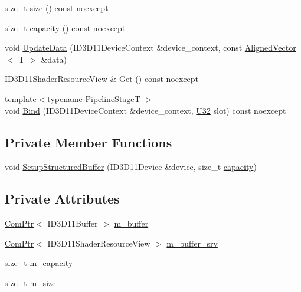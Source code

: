 \begin{DoxyCompactItemize}
\item 
size\+\_\+t \mbox{\hyperlink{classmage_1_1rendering_1_1_structured_buffer_aa7e7d6cc81b608d6333cd2c659189605}{size}} () const noexcept
\item 
size\+\_\+t \mbox{\hyperlink{classmage_1_1rendering_1_1_structured_buffer_aa7b9ec40ba586d8f4a063926d4924b70}{capacity}} () const noexcept
\item 
void \mbox{\hyperlink{classmage_1_1rendering_1_1_structured_buffer_af08d78a68111bc28890eb10610db8a73}{Update\+Data}} (I\+D3\+D11\+Device\+Context \&device\+\_\+context, const \mbox{\hyperlink{namespacemage_a8664bfb5ce2179fc64eae9f82c8a5ba8}{Aligned\+Vector}}$<$ T $>$ \&data)
\item 
I\+D3\+D11\+Shader\+Resource\+View \& \mbox{\hyperlink{classmage_1_1rendering_1_1_structured_buffer_af7e538ca119896eb776d0da6b18029ea}{Get}} () const noexcept
\item 
{\footnotesize template$<$typename Pipeline\+StageT $>$ }\\void \mbox{\hyperlink{classmage_1_1rendering_1_1_structured_buffer_aeef55c61fc5331b08c3ae2cba8f8de64}{Bind}} (I\+D3\+D11\+Device\+Context \&device\+\_\+context, \mbox{\hyperlink{namespacemage_aa5d6eaabaac3cdd01873d6a3d27e90f3}{U32}} slot) const noexcept
\end{DoxyCompactItemize}
\subsection*{Private Member Functions}
\begin{DoxyCompactItemize}
\item 
void \mbox{\hyperlink{classmage_1_1rendering_1_1_structured_buffer_a41ed97f1fd3e77ba18abf25e957e82b2}{Setup\+Structured\+Buffer}} (I\+D3\+D11\+Device \&device, size\+\_\+t \mbox{\hyperlink{classmage_1_1rendering_1_1_structured_buffer_aa7b9ec40ba586d8f4a063926d4924b70}{capacity}})
\end{DoxyCompactItemize}
\subsection*{Private Attributes}
\begin{DoxyCompactItemize}
\item 
\mbox{\hyperlink{namespacemage_ae74f374780900893caa5555d1031fd79}{Com\+Ptr}}$<$ I\+D3\+D11\+Buffer $>$ \mbox{\hyperlink{classmage_1_1rendering_1_1_structured_buffer_a57a60148175840b9dbf8001c6f290994}{m\+\_\+buffer}}
\item 
\mbox{\hyperlink{namespacemage_ae74f374780900893caa5555d1031fd79}{Com\+Ptr}}$<$ I\+D3\+D11\+Shader\+Resource\+View $>$ \mbox{\hyperlink{classmage_1_1rendering_1_1_structured_buffer_a2dd3ced6cf7b58de6b76d8175a07ec68}{m\+\_\+buffer\+\_\+srv}}
\item 
size\+\_\+t \mbox{\hyperlink{classmage_1_1rendering_1_1_structured_buffer_aa693230d08fa2653ae3b445b7bd61617}{m\+\_\+capacity}}
\item 
size\+\_\+t \mbox{\hyperlink{classmage_1_1rendering_1_1_structured_buffer_a191b95f553629b613d987782cb71bb29}{m\+\_\+size}}
\end{DoxyCompactItemize}


